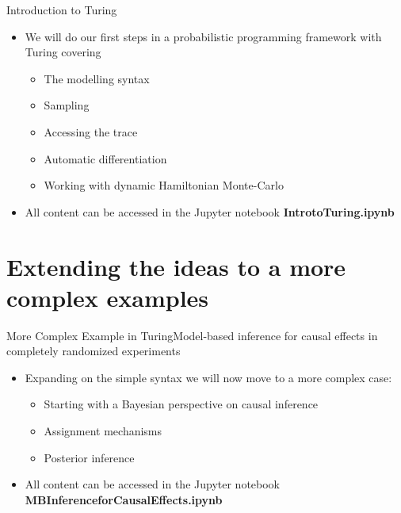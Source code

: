 \documentclass[AERbeamer%
              ,optEnglish%
              ,optBiber%
              ,optBibstyleAlphabetic%
              ,optBeamerClassicFormat%
              ]{AERlatex}%
\begin{document}
\begin{frame}[c]{Introduction to Turing}
    \centering
    \begin{itemize}
        \item We will do our first steps in a probabilistic programming framework with Turing covering
        \begin{itemize}
            \item The modelling syntax
            \item Sampling
            \item Accessing the trace
            \item Automatic differentiation
            \item Working with dynamic Hamiltonian Monte-Carlo
        \end{itemize}
        \item All content can be accessed in the Jupyter notebook \textbf{IntrotoTuring.ipynb}
    \end{itemize}
\end{frame}


\section{Extending the ideas to a more complex examples}


\begin{frame}[c]{More Complex Example in Turing}{Model-based inference for causal effects in completely randomized experiments}
    \centering
    \begin{itemize}
        \item Expanding on the simple syntax we will now move to a more complex case:
        \begin{itemize}
            \item Starting with a Bayesian perspective on causal inference
            \item Assignment mechanisms
            \item Posterior inference
        \end{itemize}
        \item All content can be accessed in the Jupyter notebook \textbf{MBInferenceforCausalEffects.ipynb}
    \end{itemize}
\end{frame}






%
%
%
%
\end{document}

